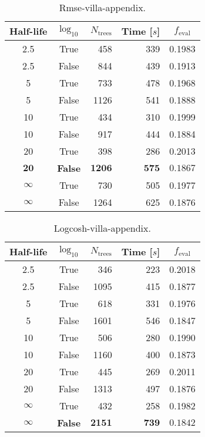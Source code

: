  \begin{table}[h!]
  \begin{tabular}{@{}ccrrc@{}}
    Half-life & $\log_{10}$ & $N_\mathrm{trees}$ & Time [$s$] & $f_\mathrm{eval}$ \\
    \midrule
    \num{2.5} & True & \num{458} & \num{339} & \num{0.1983} \\
    \num{2.5} & False & \num{844} & \num{439} & \num{0.1913} \\
    \num{5} & True & \num{733} & \num{478} & \num{0.1968} \\
    \num{5} & False & \num{1126} & \num{541} & \num{0.1888} \\
    \num{10} & True & \num{434} & \num{310} & \num{0.1999} \\
    \num{10} & False & \num{917} & \num{444} & \num{0.1884} \\
    \num{20} & True & \num{398} & \num{286} & \num{0.2013} \\
    $\mathbf{20}$ & \textbf{False} & $\mathbf{1206}$ & $\mathbf{575}$ & $\mathbf{0.1867}$ \\
    $\infty$ & True & \num{730} & \num{505} & \num{0.1977} \\
    $\infty$ & False & \num{1264} & \num{625} & \num{0.1876} \\
  \end{tabular}
  \caption{\label{tab:h:HPO_initial_Rmse-villa-appendix}Rmse-villa-appendix.}
\end{table}


\begin{table}[h!]
  \begin{tabular}{@{}ccrrc@{}}
    Half-life & $\log_{10}$ & $N_\mathrm{trees}$ & Time [$s$] & $f_\mathrm{eval}$ \\
    \midrule
    \num{2.5} & True & \num{346} & \num{223} & \num{0.2018} \\
    \num{2.5} & False & \num{1095} & \num{415} & \num{0.1877} \\
    \num{5} & True & \num{618} & \num{331} & \num{0.1976} \\
    \num{5} & False & \num{1601} & \num{546} & \num{0.1847} \\
    \num{10} & True & \num{506} & \num{280} & \num{0.1990} \\
    \num{10} & False & \num{1160} & \num{400} & \num{0.1873} \\
    \num{20} & True & \num{445} & \num{269} & \num{0.2011} \\
    \num{20} & False & \num{1313} & \num{497} & \num{0.1876} \\
    $\infty$ & True & \num{432} & \num{258} & \num{0.1982} \\
    $\bm{\infty}$ & \textbf{False} & $\mathbf{2151}$ & $\mathbf{739}$ & $\mathbf{0.1842}$ \\
  \end{tabular}
  \caption{\label{tab:h:HPO_initial_Logcosh-villa-appendix}Logcosh-villa-appendix.}
\end{table}

